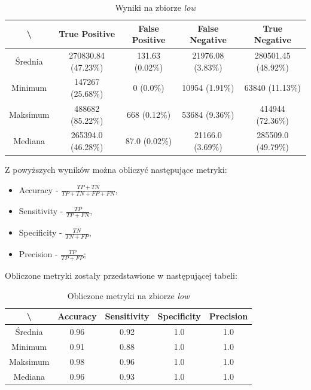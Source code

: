 \begin{table}[!h]
	\centering
	\caption{Wyniki na zbiorze \textit{low}}
	\vspace{6pt}
	{\footnotesize
		\begin{tabular}{|c|c|c|c|c|}
			\hline \textbackslash & True Positive & False Positive & False Negative & True Negative \\
      \hline Średnia & 270830.84 (47.23\%) & 131.63 (0.02\%) & 21976.08 (3.83\%) & 280501.45 (48.92\%) \\
      \hline Minimum & 147267 (25.68\%) & 0 (0.0\%) & 10954 (1.91\%) & 63840 (11.13\%) \\
      \hline Maksimum & 488682 (85.22\%) & 668 (0.12\%) & 53684 (9.36\%) & 414944 (72.36\%) \\
      \hline Mediana & 265394.0 (46.28\%) & 87.0 (0.02\%) & 21166.0 (3.69\%) & 285509.0 (49.79\%) \\
      \hline
		\end{tabular}
	}
	\vspace{0pt}
\end{table}

\vspace{1cm}

Z powyższych wyników można obliczyć następujące metryki:

\begin{itemize}
  \label{sec:miary}
  \item Accuracy - $ \frac{TP + TN}{TP + TN + FP + FN} $,
  \item Sensitivity - $ \frac{TP}{TP + FN} $,
  \item Specificity - $ \frac{TN}{TN + FP} $,
  \item Precision - $ \frac{TP}{TP + FP} $;
\end{itemize}

Obliczone metryki zostały przedstawione w następującej tabeli:

\begin{table}[!h]
	\centering
	\caption{Obliczone metryki na zbiorze \textit{low}}
	\vspace{6pt}
	{\footnotesize
		\begin{tabular}{|c|c|c|c|c|}
			\hline \textbackslash & Accuracy & Sensitivity & Specificity & Precision \\
      \hline Średnia & 0.96 & 0.92 & 1.0 & 1.0 \\
      \hline Minimum & 0.91 & 0.88 & 1.0 & 1.0 \\
      \hline Maksimum & 0.98 & 0.96 & 1.0 & 1.0 \\
      \hline Mediana & 0.96 & 0.93 & 1.0 & 1.0 \\
      \hline
		\end{tabular}
	}
	\vspace{0pt}
\end{table}
